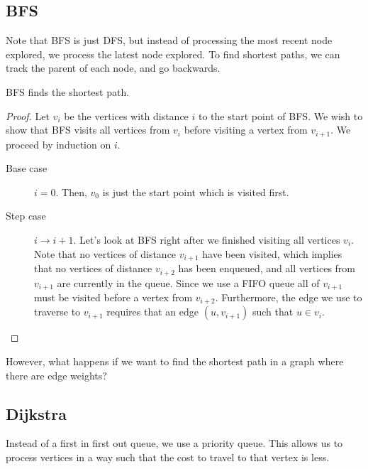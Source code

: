 
\subsection{BFS}

Note that BFS is just DFS, but instead of processing the most recent node explored, we process the latest node explored. To find shortest paths, we can track the parent of each node, and go backwards.

\begin{theorem}
	BFS finds the shortest path.
\end{theorem}
\begin{proof}
	Let \( v_i \) be the vertices with distance \( i \) to the start point of BFS. We wish to show that BFS visits all vertices from \( v_i \) before visiting a vertex from \( v_{i+1} \). We proceed by induction on \( i \).
	\begin{description}
		\item[Base case] \( i=0 \). Then, \( v_0 \) is just the start point which is visited first.
		\item[Step case] \( i \to i + 1\). Let's look at BFS right after we finished visiting all vertices \( v_i \). Note that no vertices of distance \( v_{i+1} \) have been visited, which implies that no vertices of distance \( v_{i+2} \) has been enqueued, and all vertices from \( v_{i+1} \) are currently in the queue. Since we use a FIFO queue all of \( v_{i+1} \) must be visited before a vertex from \( v_{i+2} \). Furthermore, the edge we use to traverse to \( v_{i+1} \) requires that an edge \( (u, v_{i+1}) \) such that \( u \in v_i \).
	\end{description}
\end{proof}

However, what happens if we want to find the shortest path in a graph where there are edge weights?

\subsection{Dijkstra}
Instead of a first in first out queue, we use a priority queue. This allows us to process vertices in a way such that the cost to travel to that vertex is less.
